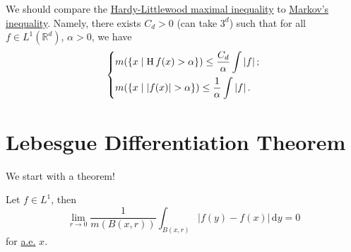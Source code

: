 We should compare the \hyperref[thm:HL-maximal-inequality]{Hardy-Littlewood maximal inequality} to \hyperref[lma:Markov-inequality]{Markov's inequality}.
Namely, there exists \(C_{d} >0\) (can take \(3^d\)) such that for all \(f\in L^1(\mathbb{R} ^d)\), \(\alpha > 0\), we have
\[
	\begin{dcases}
		m(\left\{x\mid \operatorname{H}f(x) > \alpha\right\})                \leq \frac{C_{d} }{\alpha }\int \left\vert f \right\vert; \\
		m(\left\{x\mid \left\vert f(x) \right\vert > \alpha \right\})  \leq \frac{1}{\alpha }\int \left\vert f \right\vert.
	\end{dcases}
\]

\section{Lebesgue Differentiation Theorem}
We start with a theorem!
\begin{theorem}\label{thm:Lebesgue-differentiation}
	Let \(f\in L^1\), then
	\[
		\lim_{r \to 0} \frac{1}{m(B(x, r))}\int_{B(x, r)}\left\vert f(y) - f(x) \right\vert   \,\mathrm{d}y = 0
	\]
	for \hyperref[def:mu-almost-everywhere]{a.e.} \(x\).
\end{theorem}
